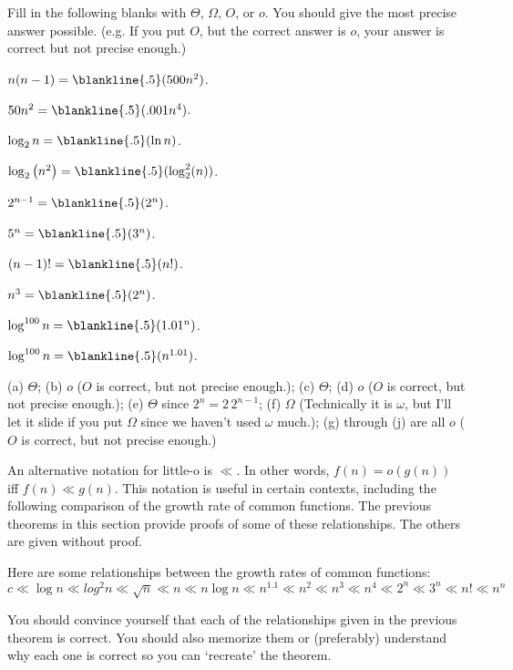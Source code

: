 \begin{fib}
Fill in the following blanks with  $\Theta$, $\Omega$, $O$, or $o$.
You should give the most precise answer possible. (e.g. If you put $O$, but
the correct answer is $o$, your answer is correct but not precise enough.)
\begin{lenum}
\item $n(n-1)=\blankline{.5}(500n^2)$.
\item $50n^2=\blankline{.5}(.001n^4)$.
\item $\log_2{n}=\blankline{.5}(\ln{n})$.
\item $\log_2\left(n^2\right)=\blankline{.5}(\log_2^2(n))$.
\item $2^{n-1}=\blankline{.5}(2^n)$.
\item $5^{n}=\blankline{.5}(3^n)$.
\item $(n-1)!=\blankline{.5}(n!)$.
\item $n^3=\blankline{.5}(2^n)$.
\item $\log^{100}n=\blankline{.5}(1.01^n)$.
\item $\log^{100}n=\blankline{.5}(n^{1.01})$.
\end{lenum}
\begin{answer}
(a) $\Theta$;
(b) $o$ ($O$ is correct, but not precise enough.);
(c) $\Theta$;
(d) $o$ ($O$ is correct, but not precise enough.);
(e) $\Theta$ since $2^n=2\,2^{n-1}$;
(f) $\Omega$ (Technically it is $\omega$, but I'll let it slide if you put $\Omega$ since
 we haven't used $\omega$ much.);
(g) through (j) are all $o$ ($O$ is correct, but not precise enough.)
\end{answer}
\end{fib}

An alternative notation for little-o is $\ll$.  In other words, $f(n)=o(g(n))$ iff
$f(n)\ll g(n)$.  This notation is useful in certain contexts, including the following
comparison of the growth rate of common functions.  The previous theorems in this section
provide proofs of some of these relationships.  The others are given without proof.

\begin{thm}
Here are some relationships between the growth rates of common functions:
$$c \ll \log n \ll log^{2} n \ll \sqrt n \ll 
n \ll n \log n \ll n^{1.1} \ll n^{2} \ll  n^3 \ll n^4 \ll 2^n\ll 3^n\ll n!\ll n^n$$
\end{thm}

You should convince yourself that each of the relationships given in the previous
theorem is correct.  You should also memorize them or (preferably) understand why
each one is correct so you can `recreate' the theorem.

